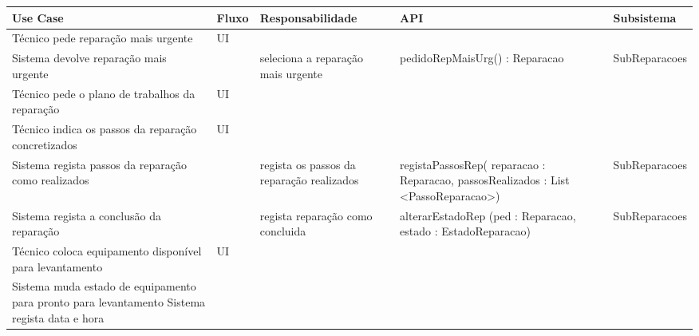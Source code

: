 \documentclass[../relatorio.tex]{subfiles}
\begin{document}
\begin{landscape}
    \begin{table}[!h]
        \centering
        \begin{tabular}{|p{5cm}|p{1cm}|p{4cm}|p{6cm}|p{3cm}|}
            \hline
            \rowcolor{gray!20!white}
            Use Case & Fluxo                                            & Responsabilidade & API & Subsistema \\
            \hline
            \rowcolor{yellow}
            Técnico pede reparação mais urgente
                     & UI
                     & 
                     & 
                     & 
            \\
            \hline
            Sistema devolve reparação mais urgente
                     & 
                     & seleciona a reparação mais urgente
                     & pedidoRepMaisUrg() : Reparacao
                     & SubReparacoes
            \\
            \hline
            \rowcolor{yellow}
            Técnico pede o plano de trabalhos da reparação
                     & UI
                     & 
                     & 
                     & 
            \\
            \hline
            \rowcolor{yellow}
            Técnico indica os passos da reparação concretizados
                     & UI
                     & 
                     & 
                     & 
            \\
            \hline
            Sistema regista passos da reparação como realizados
                     & 
                     & regista os passos da reparação realizados 
                     & registaPassosRep( reparacao : Reparacao, passosRealizados : List <PassoReparacao>)
                     & SubReparacoes
            \\
            \hline
            Sistema regista a conclusão da reparação
                     & 
                     & regista reparação como concluida
                     & alterarEstadoRep (ped : Reparacao, estado : EstadoReparacao)
                     & SubReparacoes
            \\
            \hline
            Técnico coloca equipamento disponível para levantamento
                     & UI
                     & 
                     & 
                     & 
            \\
            \hline
            Sistema muda estado de equipamento para pronto para levantamento
            Sistema regista data e hora

\end{tabular}
\end{table}
\end{landscape}
\end{document}
